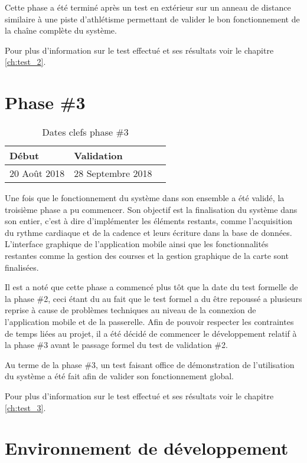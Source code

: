 Cette phase a été terminé après un test en extérieur sur un anneau de distance similaire à une piste d'athlétisme permettant de valider le bon fonctionnement de la chaîne complète du système.

Pour plus d'information sur le test effectué et ses résultats voir le chapitre \ref{ch:test_2}.

\section{Phase \#3}

\begin{table}[htb]
\caption{Dates clefs phase \#3}
\label{tab:detail_phase_3}
\centering
\begin{tabular}{ l l l }
\toprule
Début & Validation \\
\midrule
20 Août 2018 & 28 Septembre 2018  \\
\bottomrule 
\end{tabular}
\end{table}

Une fois que le fonctionnement du système dans son ensemble a été validé, la troisième phase a pu commencer. Son objectif est la finalisation du système dans son entier, c'est à dire d'implémenter les éléments restants, comme l'acquisition du rythme cardiaque et de la cadence et leurs écriture dans la base de données. L'interface graphique de l'application mobile ainsi que les fonctionnalités restantes comme la gestion des courses et la gestion graphique de la carte sont finalisées.

Il est a noté que cette phase a commencé plus tôt que la date du test formelle de la phase \#2, ceci étant du au fait que le test formel a du être repoussé a plusieurs reprise à cause de problèmes techniques au niveau de la connexion de l'application mobile et de la passerelle. Afin de pouvoir respecter les contraintes de temps liées au projet, il a été décidé de commencer le développement relatif à la phase \#3 avant le passage formel du test de validation \#2.

Au terme de la phase \#3, un test faisant office de démonstration de l'utilisation du système a été fait afin de valider son fonctionnement global.

Pour plus d'information sur le test effectué et ses résultats voir le chapitre \ref{ch:test_3}.

\section{Environnement de développement}

